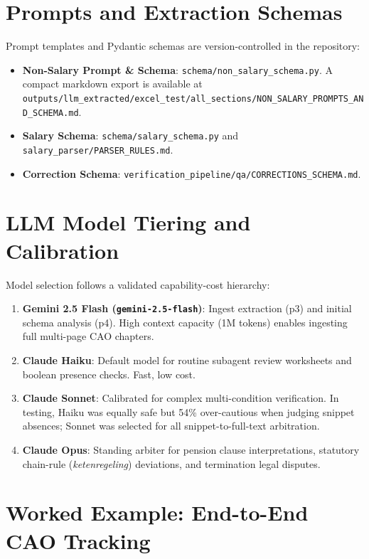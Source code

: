 \appendix
\section{Prompts and Extraction Schemas}
\label{app:schemas}

Prompt templates and Pydantic schemas are version-controlled in the repository:
\begin{itemize}[noitemsep,topsep=2pt,leftmargin=1.5em]
  \item \textbf{Non-Salary Prompt \& Schema}: \nolinkurl{schema/non_salary_schema.py}. A compact markdown export is available at \nolinkurl{outputs/llm_extracted/excel_test/all_sections/NON_SALARY_PROMPTS_AND_SCHEMA.md}.
  \item \textbf{Salary Schema}: \nolinkurl{schema/salary_schema.py} and \nolinkurl{salary_parser/PARSER_RULES.md}.
  \item \textbf{Correction Schema}: \nolinkurl{verification_pipeline/qa/CORRECTIONS_SCHEMA.md}.
\end{itemize}

\section{LLM Model Tiering and Calibration}
\label{app:models}

Model selection follows a validated capability-cost hierarchy:
\begin{enumerate}[noitemsep,topsep=2pt,leftmargin=1.5em]
  \item \textbf{Gemini 2.5 Flash (\texttt{gemini-2.5-flash})}: Ingest extraction (p3) and initial schema analysis (p4). High context capacity (1M tokens) enables ingesting full multi-page CAO chapters.
  \item \textbf{Claude Haiku}: Default model for routine subagent review worksheets and boolean presence checks. Fast, low cost.
  \item \textbf{Claude Sonnet}: Calibrated for complex multi-condition verification. In testing, Haiku was equally safe but 54\% over-cautious when judging snippet absences; Sonnet was selected for all snippet-to-full-text arbitration.
  \item \textbf{Claude Opus}: Standing arbiter for pension clause interpretations, statutory chain-rule (\emph{ketenregeling}) deviations, and termination legal disputes.
\end{enumerate}

\section{Worked Example: End-to-End CAO Tracking}
\label{app:worked-example}

